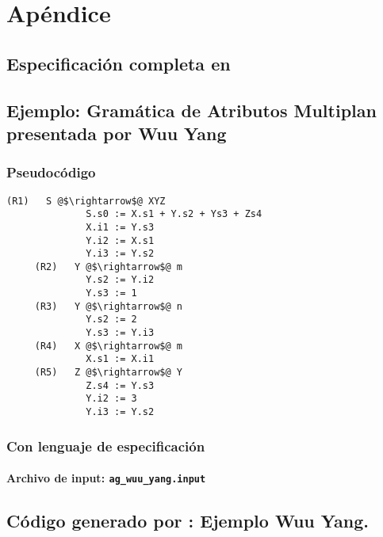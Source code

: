 \chapter{Apéndice}
\label{chap:appendix}

\section{Especificación completa en \spirit}
\label{append:grammarspirit}



\section{Ejemplo: Gramática de Atributos Multiplan presentada por Wuu Yang}
\label{append:agwuuyang}

\subsection{Pseudocódigo}
\begin{lstlisting}[basicstyle=\scriptsize, escapeinside=@@, backgroundcolor=\color{white}]
     (R1)   S @$\rightarrow$@ XYZ      
              S.s0 := X.s1 + Y.s2 + Ys3 + Zs4
              X.i1 := Y.s3  
              Y.i2 := X.s1
              Y.i3 := Y.s2
     (R2)   Y @$\rightarrow$@ m        
              Y.s2 := Y.i2
              Y.s3 := 1
     (R3)   Y @$\rightarrow$@ n        
              Y.s2 := 2
              Y.s3 := Y.i3
     (R4)   X @$\rightarrow$@ m        
              X.s1 := X.i1
     (R5)   Z @$\rightarrow$@ Y        
              Z.s4 := Y.s3
              Y.i2 := 3
              Y.i3 := Y.s2
\end{lstlisting} 

\subsection{Con lenguaje de especificación}

\subsubsection*{Archivo de input: \texttt{ag\_wuu\_yang.input}}


\section{Código generado por \maggen: Ejemplo Wuu Yang.}
\label{append:agwuuyangcode}


